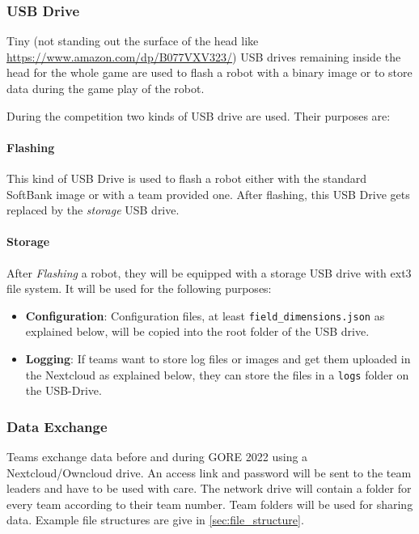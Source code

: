 \subsubsection{USB Drive}
\label{sec:c3_USB_Drive}
Tiny (not standing out the surface of the head like \url{https://www.amazon.com/dp/B077VXV323/}) USB drives remaining inside the head for the whole game are used to flash a robot with a binary image or to store data during the game play of the robot.

During the competition two kinds of USB drive are used. Their purposes are:

\paragraph*{Flashing}
This kind of USB Drive is used to flash a robot either with the standard SoftBank image or with a team provided one. After flashing, this USB Drive gets replaced by the \textit{storage} USB drive.

\paragraph*{Storage}
After \textit{Flashing} a robot, they will be equipped with a storage USB drive with ext3 file system. It will be used for the following purposes:

\begin{itemize}
	\item \textbf{Configuration}: Configuration files, at least \texttt{field\_dimensions.json} as explained below, will be copied into the root folder of the USB drive.
	\item  \textbf{Logging}: If teams want to store log files or images and get them uploaded in the Nextcloud as explained below, they can store the files in a \texttt{logs} folder on the USB-Drive.
\end{itemize}

\subsubsection{Data Exchange}
\label{sec:data_exchange}
Teams exchange data before and during GORE 2022 using a Nextcloud/Owncloud drive. An access link and password will be sent to the team leaders and have to be used with care. The network drive will contain a folder for every team according to their team number. Team folders will be used for sharing data. Example file structures are give in \ref{sec:file_structure}. 

